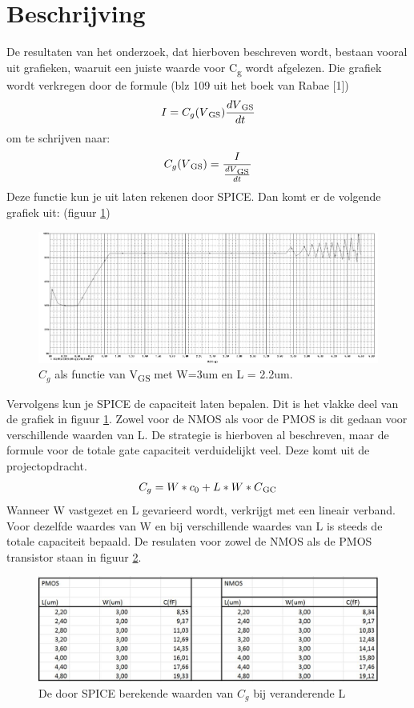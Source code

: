 \documentclass{report}
\begin{document}
\newcommand{\tss}{\textsubscript}
\section{Beschrijving}
De resultaten van het onderzoek, dat hierboven beschreven wordt, bestaan vooral uit grafieken, waaruit een juiste waarde voor C\tss{g} wordt afgelezen. Die grafiek wordt verkregen door de formule (blz 109 uit het boek van Rabae [1])
\begin{equation}
I = C_g(V\tss{GS}) \frac{dV\tss{GS}}{dt}
\end{equation}
om te schrijven naar:
\begin{equation}
C_g(V\tss{GS})= \frac{I}{ \frac{dV\tss{GS}}{dt}}
\end{equation}
Deze functie kun je uit laten rekenen door SPICE. Dan komt er de volgende grafiek uit: (figuur \ref{res:1}) \newline
\begin{figure} [h!]
\includegraphics [width = \textwidth] {../figures/nmos/C_L_2_2}
\caption{$C_g$ als functie van V\tss{GS} met W=3um en L = 2.2um.}
\label{res:1}
\end{figure}
Vervolgens kun je SPICE de capaciteit laten bepalen. Dit is het vlakke deel van de grafiek in figuur \ref{res:1}. Zowel voor  de NMOS als voor de PMOS is dit gedaan voor verschillende waarden van L. De strategie is hierboven al beschreven, maar de formule voor de totale gate capaciteit verduidelijkt veel. Deze komt uit de projectopdracht. 
\begin{equation} \label{res:eq1}
C_g = W *c_0 + L *W *C\tss{GC}
\end{equation}
Wanneer W vastgezet en L gevarieerd wordt, verkrijgt met een lineair verband. Voor dezelfde waardes van W en bij verschillende waardes van L is steeds de totale capaciteit bepaald. De resulaten voor zowel de NMOS als de PMOS transistor staan in figuur \ref{res:2}.
\begin{figure} [h!]
\includegraphics [scale = 0.4] {../figures/tabel}
\caption{De door SPICE berekende waarden van $C_g$ bij veranderende L}
\label{res:2}
\end{figure}
\end{document}
